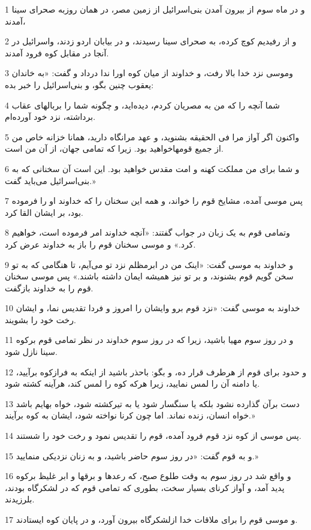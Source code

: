 \par 1 و در ماه سوم از بیرون آمدن بنی‌اسرائیل از زمین مصر، در همان روزبه صحرای سینا آمدند، 
\par 2 و از رفیدیم کوچ کرده، به صحرای سینا رسیدند، و در بیابان اردو زدند، واسرائیل در آنجا در مقابل کوه فرود آمدند.
\par 3 وموسی نزد خدا بالا رفت، و خداوند از میان کوه اورا ندا درداد و گفت: «به خاندان یعقوب چنین بگو، و بنی‌اسرائیل را خبر بده:
\par 4 شما آنچه را که من به مصریان کردم، دیده‌اید، و چگونه شما را بربالهای عقاب برداشته، نزد خود آورده‌ام.
\par 5 واکنون اگر آواز مرا فی الحقیقه بشنوید، و عهد مرانگاه دارید، همانا خزانه خاص من از جمیع قومهاخواهید بود. زیرا که تمامی جهان، از آن من است.
\par 6 و شما برای من مملکت کهنه و امت مقدس خواهید بود. این است آن سخنانی که به بنی‌اسرائیل می‌باید گفت.»
\par 7 پس موسی آمده، مشایخ قوم را خواند، و همه این سخنان را که خداوند او را فرموده بود، بر ایشان القا کرد.
\par 8 وتمامی قوم به یک زبان در جواب گفتند: «آنچه خداوند امر فرموده است، خواهیم کرد.» و موسی سخنان قوم را باز به خداوند عرض کرد.
\par 9 و خداوند به موسی گفت: «اینک من در ابرمظلم نزد تو می‌آیم، تا هنگامی که به تو سخن گویم قوم بشنوند، و بر تو نیز همیشه ایمان داشته باشند.» پس موسی سخنان قوم را به خداوند بازگفت.
\par 10 خداوند به موسی گفت: «نزد قوم برو وایشان را امروز و فردا تقدیس نما، و ایشان رخت خود را بشویند.
\par 11 و در روز سوم مهیا باشید، زیرا که در روز سوم خداوند در نظر تمامی قوم برکوه سینا نازل شود.
\par 12 و حدود برای قوم از هرطرف قرار ده، و بگو: باحذر باشید از اینکه به فرازکوه برآیید، یا دامنه آن را لمس نمایید، زیرا هر‌که کوه را لمس کند، هرآینه کشته شود.
\par 13 دست برآن گذارده نشود بلکه یا سنگسار شود یا به تیرکشته شود، خواه بهایم باشد خواه انسان، زنده نماند. اما چون کرنا نواخته شود، ایشان به کوه برآیند.»
\par 14 پس موسی از کوه نزد قوم فرود آمده، قوم را تقدیس نمود و رخت خود را شستند.
\par 15 و به قوم گفت: «در روز سوم حاضر باشید، و به زنان نزدیکی منمایید.»
\par 16 و واقع شد در روز سوم به وقت طلوع صبح، که رعدها و برقها و ابر غلیظ برکوه پدید آمد، و آواز کرنای بسیار سخت، بطوری که تمامی قوم که در لشکرگاه بودند، بلرزیدند.
\par 17 و موسی قوم را برای ملاقات خدا ازلشکرگاه بیرون آورد، و در پایان کوه ایستادند.

